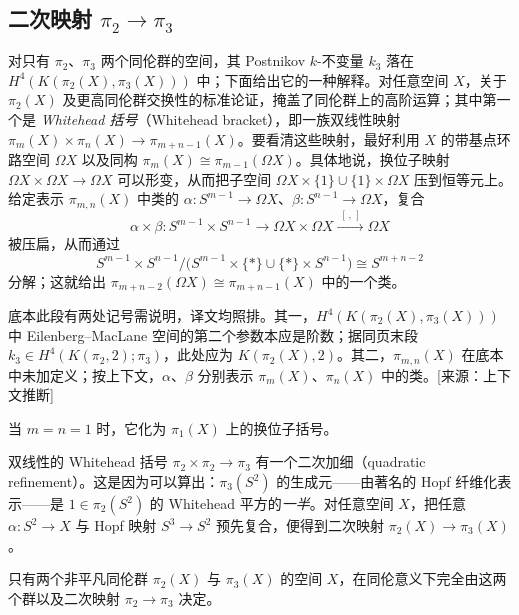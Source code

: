 \setcounter{theorem}{7}

\subsection{二次映射 \texorpdfstring{$\pi_2\to\pi_3$}{π2 到 π3}}

对只有 $\pi_2$、$\pi_3$ 两个同伦群的空间，其 Postnikov $k$-不变量 $k_3$ 落在 $H^4(K(\pi_2(X),\pi_3(X)))$ 中；下面给出它的一种解释。对任意空间 $X$，关于 $\pi_2(X)$ 及更高同伦群交换性的标准论证，掩盖了同伦群上的高阶运算；其中第一个是 \emph{Whitehead 括号}（Whitehead bracket），即一族双线性映射 $\pi_m(X)\times\pi_n(X)\to\pi_{m+n-1}(X)$。要看清这些映射，最好利用 $X$ 的带基点环路空间 $\Omega X$ 以及同构 $\pi_m(X)\cong\pi_{m-1}(\Omega X)$。具体地说，换位子映射 $\Omega X\times\Omega X\to\Omega X$ 可以形变，从而把子空间 $\Omega X\times\{1\}\cup\{1\}\times\Omega X$ 压到恒等元上。给定表示 $\pi_{m,n}(X)$ 中类的 $\alpha\colon S^{m-1}\to\Omega X$、$\beta\colon S^{n-1}\to\Omega X$，复合
\[
\alpha\times\beta\colon S^{m-1}\times S^{n-1}\to\Omega X\times\Omega X\xrightarrow{\;[\,,\,]\;}\Omega X
\]
被压扁，从而通过
\[
S^{m-1}\times S^{n-1}\big/\bigl(S^{m-1}\times\{*\}\cup\{*\}\times S^{n-1}\bigr)\cong S^{m+n-2}
\]
分解；这就给出 $\pi_{m+n-2}(\Omega X)\cong\pi_{m+n-1}(X)$ 中的一个类。

\begin{annote}底本此段有两处记号需说明，译文均照排。其一，$H^4(K(\pi_2(X),\pi_3(X)))$ 中 Eilenberg--MacLane 空间的第二个参数本应是阶数；据同页末段 $k_3\in H^4(K(\pi_2,2);\pi_3)$，此处应为 $K(\pi_2(X),2)$。其二，$\pi_{m,n}(X)$ 在底本中未加定义；按上下文，$\alpha$、$\beta$ 分别表示 $\pi_m(X)$、$\pi_n(X)$ 中的类。[来源：上下文推断]\end{annote}

\begin{remark}当 $m=n=1$ 时，它化为 $\pi_1(X)$ 上的换位子括号。\end{remark}

双线性的 Whitehead 括号 $\pi_2\times\pi_2\to\pi_3$ 有一个二次加细（quadratic refinement）。这是因为可以算出：$\pi_3(S^2)$ 的生成元——由著名的 Hopf 纤维化表示——是 $1\in\pi_2(S^2)$ 的 Whitehead 平方的\emph{一半}。对任意空间 $X$，把任意 $\alpha\colon S^2\to X$ 与 Hopf 映射 $S^3\to S^2$ 预先复合，便得到二次映射 $\pi_2(X)\to\pi_3(X)$。

\begin{theorem}只有两个非平凡同伦群 $\pi_2(X)$ 与 $\pi_3(X)$ 的空间 $X$，在同伦意义下完全由这两个群以及二次映射 $\pi_2\to\pi_3$ 决定。\end{theorem}

